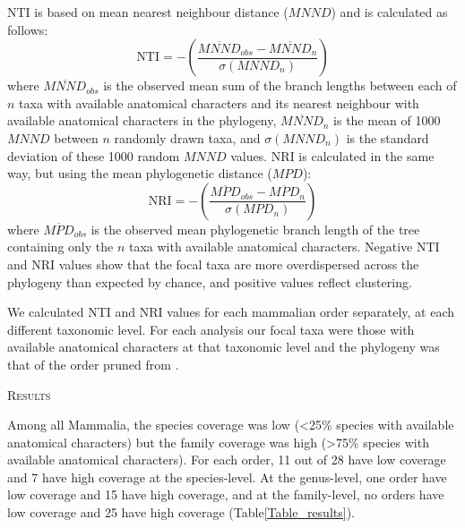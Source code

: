 \documentclass[12pt,letterpaper]{article}
\renewcommand{\section}[1]{%
\bigskip
\begin{center}
\begin{Large}
\normalfont\scshape #1
\medskip
\end{Large}
\end{center}}
\begin{document}
NTI \cite{webb2002phylogenies} is based on mean nearest neighbour distance ($MNND$) and is calculated as follows:
  \begin{equation}
    \text{NTI}=-\left(\frac{\overline{MNND}_{obs}-\overline{MNND}_{n}}{\sigma(MNND_{n})}\right)
  \end{equation}
where $\overline{MNND}_{obs}$ is the observed mean sum of the branch lengths between each of $n$ taxa with available anatomical characters and its nearest neighbour with available anatomical characters in the phylogeny, 
$\overline{MNND}_{n}$ is the mean of 1000 $MNND$ between $n$ randomly drawn taxa, and $\sigma(MNND_{n})$ is the standard deviation of these 1000 random $MNND$ values.
NRI is calculated in the same way, but using the mean phylogenetic distance ($MPD$):
  \begin{equation}
    \text{NRI}=-\left(\frac{\overline{MPD}_{obs}-\overline{MPD}_{n}}{\sigma(MPD_{n})}\right)
  \end{equation}
where $\overline{MPD}_{obs}$ is the observed mean phylogenetic branch length of the tree containing only the $n$ taxa with available anatomical characters.
Negative NTI and NRI values show that the focal taxa are more overdispersed across the phylogeny than expected by chance, and positive values reflect clustering.

We calculated NTI and NRI values for each mammalian order separately, at each different taxonomic level. 
For each analysis our focal taxa were those with available anatomical characters at that taxonomic level and the phylogeny was that of the order pruned from \cite{BinindaEmonds}.

%
%


\section{Results}
Among all Mammalia, the species coverage was low (\textless 25\% species with available anatomical characters) but the family coverage was high (\textgreater 75\% species with available anatomical characters).
For each order, 11 out of 28 have low coverage and 7 have high coverage at the species-level.
At the genus-level, one order have low coverage and 15 have high coverage, and at the family-level, no orders have low coverage and 25 have high coverage (Table\ref{Table_results}).

\end{document}
